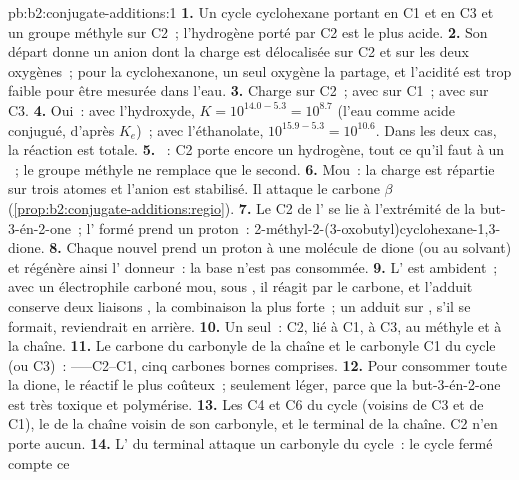 \begin{solution}{pb:b2:conjugate-additions:1}
\textbf{1.} Un cycle cyclohexane portant  en C1 et en C3 et un groupe méthyle sur C2~; l'hydrogène
porté par C2 est le plus acide.
\textbf{2.} Son départ donne un anion dont la charge est délocalisée sur C2 et sur les deux oxygènes~; pour
la cyclohexanone, un seul oxygène la partage, et l'acidité est trop faible pour être mesurée dans l'eau.
\textbf{3.} Charge sur C2~;  avec  sur C1~;  avec  sur C3.
\textbf{4.} Oui~: avec l'hydroxyde, $K = 10^{14.0 - 5.3} = 10^{8.7}$ (l'eau comme acide conjugué, d'après
$K_e$)~; avec l'éthanolate, $10^{15.9-5.3} = 10^{10.6}$. Dans les deux cas, la réaction est totale.
\textbf{5.} ~: C2 porte encore un hydrogène, tout ce qu'il faut à un ~; le groupe
méthyle ne remplace que le second.
\textbf{6.} Mou~: la charge est répartie sur trois atomes et l'anion est stabilisé. Il attaque le carbone
$\beta$ (\cref{prop:b2:conjugate-additions:regio}).
\textbf{7.} Le C2 de l' se lie à l'extrémité  de la but-3-én-2-one~; l' formé prend
un proton~: 2-méthyl-2-(3-oxobutyl)cyclohexane-1,3-dione.
\textbf{8.} Chaque nouvel  prend un proton à une molécule de dione (ou au solvant) et régénère
ainsi l' donneur~: la base n'est pas consommée.
\textbf{9.} L' est ambident~; avec un électrophile carboné mou, sous , il réagit
par le carbone, et l'adduit  conserve deux liaisons , la combinaison la plus forte~; un
adduit sur , s'il se formait, reviendrait en arrière.
\textbf{10.} Un seul~: C2, lié à C1, à C3, au méthyle et à la chaîne.
\textbf{11.} Le carbone du carbonyle de la chaîne et le carbonyle C1 du cycle (ou C3)~: ------C2--C1,
cinq carbones bornes comprises.
\textbf{12.} Pour consommer toute la dione, le réactif le plus coûteux~; seulement léger, parce que la
but-3-én-2-one est très toxique et polymérise.
\textbf{13.} Les C4 et C6 du cycle (voisins de C3 et de C1), le  de la chaîne voisin de son carbonyle,
et le  terminal de la chaîne. C2 n'en porte aucun.
\textbf{14.} L' du  terminal attaque un carbonyle du cycle~: le cycle fermé compte ce

\end{solution}

